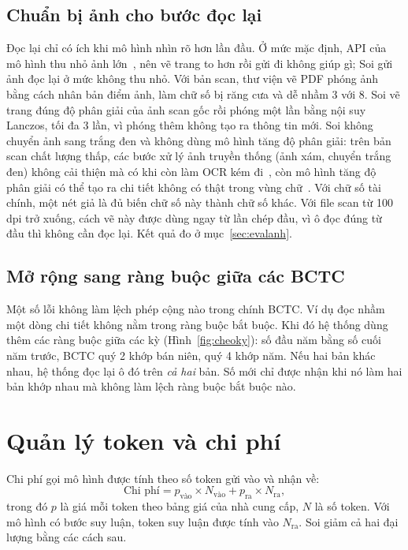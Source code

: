 \documentclass[12pt,a4paper]{report}
\begin{document}
\subsection{Chuẩn bị ảnh cho bước đọc lại}\label{sec:anhnet}
Đọc lại chỉ có ích khi mô hình nhìn rõ hơn lần đầu. Ở mức mặc định, API của mô hình thu nhỏ ảnh
lớn~\cite{openaivision}, nên vẽ trang to hơn rồi gửi đi không giúp gì; Soi gửi ảnh đọc lại ở mức không thu nhỏ. Với
bản scan, thư viện vẽ PDF phóng ảnh bằng cách nhân bản điểm ảnh, làm chữ số bị răng cưa và dễ nhầm 3 với 8. Soi vẽ
trang đúng độ phân giải của ảnh scan gốc rồi phóng một lần bằng nội suy Lanczos, tối đa 3 lần, vì phóng thêm không tạo
ra thông tin mới.
Soi không chuyển ảnh sang trắng đen và không dùng mô hình tăng độ phân giải: trên bản scan chất lượng thấp, các bước xử lý ảnh
truyền thống (ảnh xám, chuyển trắng đen) không cải thiện mà có khi còn làm OCR kém đi~\cite{ocrpipelines}, còn mô hình
tăng độ phân giải có thể tạo ra chi tiết không có thật trong vùng chữ~\cite{textsr}. Với chữ số tài chính, một nét giả là
đủ biến chữ số này thành chữ số khác. Với file scan từ 100 dpi trở xuống, cách vẽ này được dùng ngay từ lần chép đầu, vì ô đọc đúng từ đầu
thì không cần đọc lại. Kết quả đo ở mục~\ref{sec:evalanh}.

\subsection{Mở rộng sang ràng buộc giữa các BCTC}
Một số lỗi không làm lệch phép cộng nào trong chính BCTC. Ví dụ đọc nhầm một dòng chi tiết không nằm trong ràng buộc bắt
buộc. Khi đó hệ thống dùng thêm các ràng buộc giữa các kỳ (Hình~\ref{fig:cheoky}): số đầu năm bằng số cuối năm trước,
BCTC quý 2 khớp bán niên, quý 4 khớp năm. Nếu hai bản khác nhau, hệ thống đọc lại ô đó trên \emph{cả hai} bản. Số mới
chỉ được nhận khi nó làm hai bản khớp nhau mà không làm lệch ràng buộc bắt buộc nào.

\section{Quản lý token và chi phí}\label{sec:token}
Chi phí gọi mô hình được tính theo số token gửi vào và nhận về:
\begin{equation}
  \text{Chi phí} = p_{\text{vào}} \times N_{\text{vào}} + p_{\text{ra}} \times N_{\text{ra}},
\end{equation}
trong đó $p$ là giá mỗi token theo bảng giá của nhà cung cấp, $N$ là số token. Với mô hình có bước suy luận, token
suy luận được tính vào $N_{\text{ra}}$. Soi giảm cả hai đại lượng bằng các cách sau.
\end{document}
